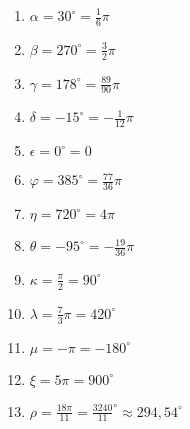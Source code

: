 \begin{Answer}[ref=bogenmassA1]
	\begin{enumerate}[label=\alph*)]
		\item \(\alpha=30^\circ=\frac{1}{6}\pi\)
		\item \(\beta=270^\circ=\frac{3}{2}\pi\)
		\item \(\gamma=178^\circ=\frac{89}{90}\pi\)
		\item \(\delta=-15^\circ=-\frac{1}{12}\pi\)
		\item \(\epsilon=0^\circ=0\)
		\item \(\varphi=385^\circ=\frac{77}{36}\pi\)
		\item \(\eta=720^\circ=4\pi\)
		\item \(\theta=-95^\circ=-\frac{19}{36}\pi\)
		\item \(\kappa=\frac{\pi}{2}=90^\circ\)
		\item \(\lambda=\frac{7}{3}\pi=420^\circ\)
		\item \(\mu=-\pi=-180^\circ\)
		\item \(\xi=5\pi=900^\circ\)
		\item \(\rho=\frac{18\pi}{11}=\frac{3240}{11}^\circ\approx294,54^\circ\)
	\end{enumerate}
\end{Answer}